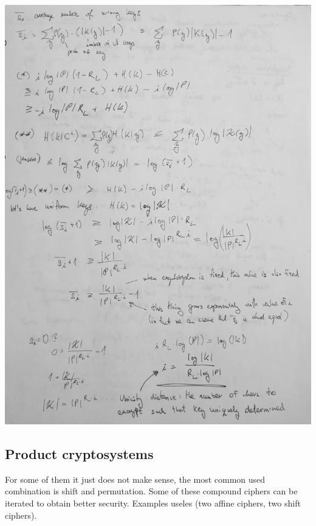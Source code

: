 \documentclass[a4paper,10pt]{article}
\begin{document}
\includegraphics[width=\textwidth]{unicity_distance.jpg}
\subsection*{Product cryptosystems}
For some of them it just does not make sense, the most common used combination is shift and permutation. Some of these compound ciphers can be iterated to obtain better security. Examples useles (two affine ciphers, two shift ciphers).
\end{document}
